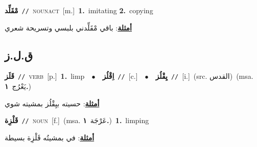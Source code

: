 \documentclass[10pt,a4paper,twoside]{article} %
\begin{document}
\begin{multicols}{2}
{\setlength\topsep{0pt}\textbf{\foreignlanguage{arabic}{مْقَلِّد}}\ {\color{gray}\texttt{//}\color{black}}\ \textsc{noun\textunderscore act}\ [m.]\ \textbf{1.}~imitating  \textbf{2.}~copying\  \begin{flushright}\color{gray}\foreignlanguage{arabic}{\textbf{\underline{\foreignlanguage{arabic}{أمثلة}}}: باقي مْقَلِّدني بلبسي وتسريحة شعري}\end{flushright}\color{black}} \vspace{2mm}

\vspace{-3mm}
\subsection*{\color{blue}\foreignlanguage{arabic}{ق.ل.ز}\color{blue}{}} 

{\setlength\topsep{0pt}\textbf{\foreignlanguage{arabic}{قَلَز}}\ {\color{gray}\texttt{//}\color{black}}\ \textsc{verb}\ [p.]\ \textbf{1.}~limp\ \ $\bullet$\ \ \setlength\topsep{0pt}\textbf{\foreignlanguage{arabic}{اِقْلُز}}\ {\color{gray}\texttt{//}\color{black}}\ [c.]\ \ $\bullet$\ \ \setlength\topsep{0pt}\textbf{\foreignlanguage{arabic}{يِقْلُز}}\ {\color{gray}\texttt{//}\color{black}}\ [i.]\ (src. \color{gray}\foreignlanguage{arabic}{القدس}\color{black})\ \color{gray}(msa. \foreignlanguage{arabic}{يَعْرُج}~\foreignlanguage{arabic}{\textbf{١.}})\color{black}\  \begin{flushright}\color{gray}\foreignlanguage{arabic}{\textbf{\underline{\foreignlanguage{arabic}{أمثلة}}}: حسيته بيِقْلُز بمشيته شوي}\end{flushright}\color{black}} \vspace{2mm}

{\setlength\topsep{0pt}\textbf{\foreignlanguage{arabic}{قَلْزِة}}\ {\color{gray}\texttt{//}\color{black}}\ \textsc{noun}\ [f.]\ \color{gray}(msa. \foreignlanguage{arabic}{عَرْجَة}~\foreignlanguage{arabic}{\textbf{١.}})\color{black}\ \textbf{1.}~limping\  \begin{flushright}\color{gray}\foreignlanguage{arabic}{\textbf{\underline{\foreignlanguage{arabic}{أمثلة}}}: في بمشيتُه قَلْزِة بسيطة}\end{flushright}\color{black}} \vspace{2mm}


\end{multicols}
\end{document}
